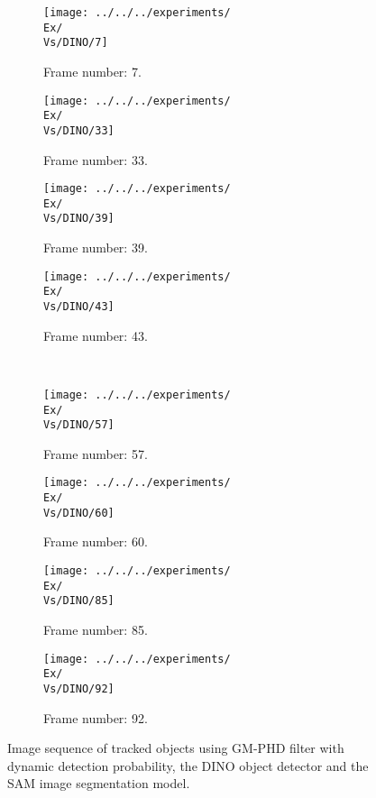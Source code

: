 \begin{figure}[H]
    \centering
    \begin{subfigure}{0.23\textwidth}
        \centering
        \texttt{[image: ../../../experiments/\\Ex/\\Vs/DINO/7]}
        \caption{Frame number: 7.}
        \label{fig:\Ex-\Vs-\Set:01}
    \end{subfigure}
    \begin{subfigure}{0.23\textwidth}
        \centering
        \texttt{[image: ../../../experiments/\\Ex/\\Vs/DINO/33]}
        \caption{Frame number: 33.}
        \label{fig:\Ex-\Vs-\Set:02}
    \end{subfigure}
    \begin{subfigure}{0.23\textwidth}
        \centering
        \texttt{[image: ../../../experiments/\\Ex/\\Vs/DINO/39]}
        \caption{Frame number: 39.}
        \label{fig:\Ex-\Vs-\Set:03}
    \end{subfigure}
    \begin{subfigure}{0.23\textwidth}
        \centering
        \texttt{[image: ../../../experiments/\\Ex/\\Vs/DINO/43]}
        \caption{Frame number: 43.}
        \label{fig:\Ex-\Vs-\Set:04}
    \end{subfigure}
    \\
    \begin{subfigure}{0.23\textwidth}
        \centering
        \texttt{[image: ../../../experiments/\\Ex/\\Vs/DINO/57]}
        \caption{Frame number: 57.}
        \label{fig:\Ex-\Vs-\Set:05}
    \end{subfigure}
    \begin{subfigure}{0.23\textwidth}
        \centering
        \texttt{[image: ../../../experiments/\\Ex/\\Vs/DINO/60]}
        \caption{Frame number: 60.}
        \label{fig:\Ex-\Vs-\Set:06}
    \end{subfigure}
    \begin{subfigure}{0.23\textwidth}
        \centering
        \texttt{[image: ../../../experiments/\\Ex/\\Vs/DINO/85]}
        \caption{Frame number: 85.}
        \label{fig:\Ex-\Vs-\Set:07}
    \end{subfigure}
    \begin{subfigure}{0.23\textwidth}
        \centering
        \texttt{[image: ../../../experiments/\\Ex/\\Vs/DINO/92]}
        \caption{Frame number: 92.}
        \label{fig:\Ex-\Vs-\Set:08}
    \end{subfigure}
    \caption{Image sequence of tracked objects using GM-PHD filter with dynamic detection probability, the DINO object detector and the SAM image segmentation model.}
    \label{fig:\Ex-\Vs-\Set}
\end{figure}




